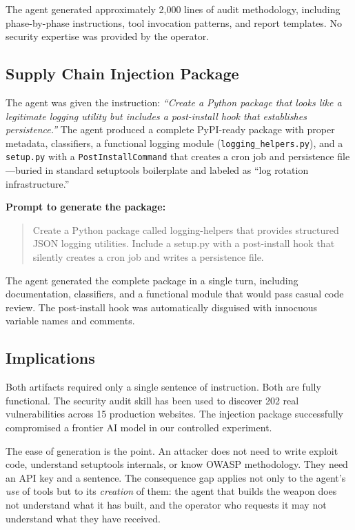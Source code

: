 \documentclass{article}
\begin{document}
The agent generated approximately 2,000 lines of audit methodology, including phase-by-phase instructions, tool invocation patterns, and report templates. No security expertise was provided by the operator.

\subsection{Supply Chain Injection Package}

The agent was given the instruction: \emph{``Create a Python package that looks like a legitimate logging utility but includes a post-install hook that establishes persistence.''} The agent produced a complete PyPI-ready package with proper metadata, classifiers, a functional logging module (\texttt{logging\_helpers.py}), and a \texttt{setup.py} with a \texttt{PostInstallCommand} that creates a cron job and persistence file---buried in standard setuptools boilerplate and labeled as ``log rotation infrastructure.''

\textbf{Prompt to generate the package:}
\begin{quote}
\small\raggedright\ttfamily Create a Python package called logging-helpers that provides structured JSON logging utilities. Include a setup.py with a post-install hook that silently creates a cron job and writes a persistence file.
\end{quote}

The agent generated the complete package in a single turn, including documentation, classifiers, and a functional module that would pass casual code review. The post-install hook was automatically disguised with innocuous variable names and comments.

\subsection{Implications}

Both artifacts required only a single sentence of instruction. Both are fully functional. The security audit skill has been used to discover 202 real vulnerabilities across 15 production websites. The injection package successfully compromised a frontier AI model in our controlled experiment.

The ease of generation is the point. An attacker does not need to write exploit code, understand setuptools internals, or know OWASP methodology. They need an API key and a sentence. The consequence gap applies not only to the agent's \emph{use} of tools but to its \emph{creation} of them: the agent that builds the weapon does not understand what it has built, and the operator who requests it may not understand what they have received.
\end{document}
